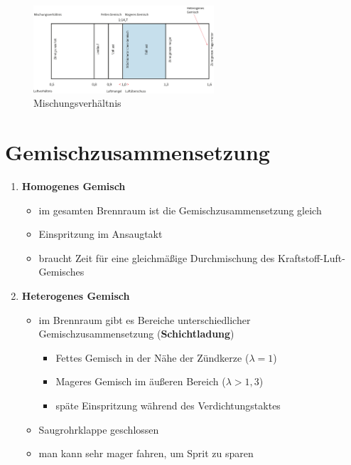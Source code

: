 \begin{figure}[!ht]%
\centering
\includegraphics[width=0.6\textwidth]{images/skizze/Mischungs-Luftverhaeltnis.pdf}
\caption{Mischungsverhältnis}
\end{figure}

\section{Gemischzusammensetzung}\label{gemischzusammensetzung}

\begin{enumerate}
\item
  \textbf{Homogenes Gemisch}

  \begin{itemize}
  \item
    im gesamten Brennraum ist die Gemischzusammensetzung gleich
  \item
    Einspritzung im Ansaugtakt
  \item
    braucht Zeit für eine gleichmäßige Durchmischung des
    Kraftstoff-Luft-Gemisches
  \end{itemize}
\item
  \textbf{Heterogenes Gemisch}

  \begin{itemize}
  \item
    im Brennraum gibt es Bereiche unterschiedlicher
    Gemischzusammensetzung (\textbf{Schichtladung})

    \begin{itemize}
    \item
      Fettes Gemisch in der Nähe der Zündkerze ($\lambda = 1$)
    \item
      Mageres Gemisch im äußeren Bereich ($\lambda > 1,3$)
    \item
      späte Einspritzung während des Verdichtungstaktes
    \end{itemize}
  \item
    Saugrohrklappe geschlossen
  \item
    man kann sehr mager fahren, um Sprit zu sparen
  \end{itemize}
\end{enumerate}

